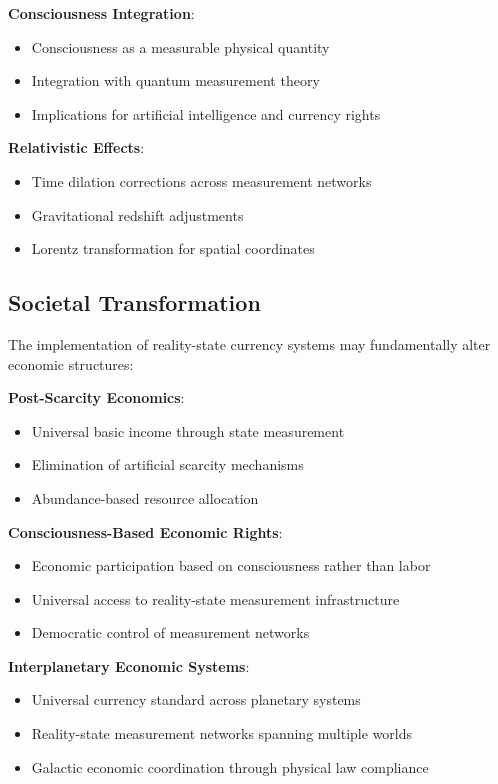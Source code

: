 \documentclass[12pt,a4paper]{article}
\begin{document}
\textbf{Consciousness Integration}:
\begin{itemize}
\item Consciousness as a measurable physical quantity
\item Integration with quantum measurement theory
\item Implications for artificial intelligence and currency rights
\end{itemize}

\textbf{Relativistic Effects}:
\begin{itemize}
\item Time dilation corrections across measurement networks
\item Gravitational redshift adjustments
\item Lorentz transformation for spatial coordinates
\end{itemize}

\subsection{Societal Transformation}

The implementation of reality-state currency systems may fundamentally alter economic structures:

\textbf{Post-Scarcity Economics}:
\begin{itemize}
\item Universal basic income through state measurement
\item Elimination of artificial scarcity mechanisms
\item Abundance-based resource allocation
\end{itemize}

\textbf{Consciousness-Based Economic Rights}:
\begin{itemize}
\item Economic participation based on consciousness rather than labor
\item Universal access to reality-state measurement infrastructure
\item Democratic control of measurement networks
\end{itemize}

\textbf{Interplanetary Economic Systems}:
\begin{itemize}
\item Universal currency standard across planetary systems
\item Reality-state measurement networks spanning multiple worlds
\item Galactic economic coordination through physical law compliance
\end{itemize}
\end{document}
